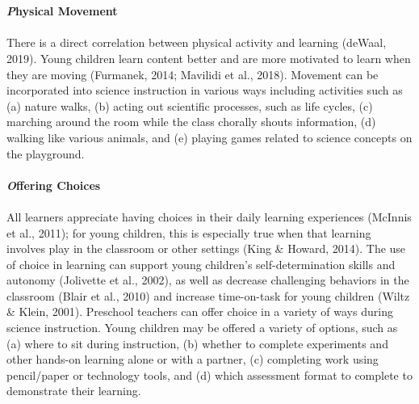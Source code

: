 \documentclass[11.5pt]{sig-alternate}
\begin{document}
\begin{large}
\begin{minipage}{\linewidth}
{\begin{tabular}{|l|l|}
\hline
\end{tabular}
}
\end{minipage}\\\\
\textbf{\emph Physical Movement}\\\\
There is a direct correlation between physical activity and learning (deWaal, 2019). Young children learn content better and are more motivated to learn when they are moving (Furmanek, 2014; Mavilidi et al., 2018). Movement can be incorporated into science instruction in various ways including activities such as (a) nature walks, (b) acting out scientific processes, such as life cycles, (c) marching around the room while the class chorally shouts information, (d) walking like various animals, and (e) playing games related to science concepts on the playground.\\\\
\textbf{\emph Offering Choices }\\\\
All learners appreciate having choices in their daily learning experiences (McInnis et al., 2011); for young children, this is especially true when that learning involves play in the classroom or other settings (King \& Howard, 2014). The use of choice in learning can support young children’s self-determination skills and autonomy (Jolivette et al., 2002), as well as decrease challenging behaviors in the classroom (Blair et al., 2010) and increase time-on-task for young children (Wiltz \& Klein, 2001). Preschool teachers can offer choice in a variety of ways during science instruction. Young children may be offered a variety of options, such as (a) where to sit during instruction, (b) whether to complete experiments and other hands-on learning alone or with a partner, (c) completing work using pencil/paper or technology tools, and (d) which assessment format to complete to demonstrate their learning.  

\end{large}
\end{document}
